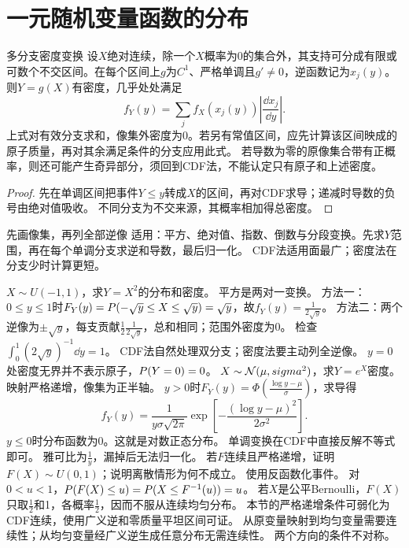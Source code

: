 \section{一元随机变量函数的分布}\label{sec:24}
\begin{theorem}{多分支密度变换}
设$X$绝对连续，除一个$X$概率为0的集合外，其支持可分成有限或可数个不交区间。在每个区间上$g$为$C^1$、严格单调且$g'\ne0$，逆函数记为$x_j(y)$。则$Y=g(X)$有密度，几乎处处满足
\begin{equation}f_Y(y)=\sum_j f_X(x_j(y))\left|\dfrac{\dd x_j}{\dd y}\right|.\end{equation}
上式对有效分支求和，像集外密度为0。若另有常值区间，应先计算该区间映成的原子质量，再对其余满足条件的分支应用此式。
若导数为零的原像集合带有正概率，则还可能产生奇异部分，须回到CDF法，不能认定只有原子和上述密度。
\end{theorem}
\begin{proof}
先在单调区间把事件$Y\le y$转成$X$的区间，再对CDF求导；递减时导数的负号由绝对值吸收。
不同分支为不交来源，其概率相加得总密度。
\end{proof}
\begin{method}{先画像集，再列全部逆像}
适用：平方、绝对值、指数、倒数与分段变换。先求$Y$范围，再在每个单调分支求逆和导数，最后归一化。
CDF法适用面最广；密度法在分支少时计算更短。
\end{method}
{$X\sim U(-1,1)$，求$Y=X^2$的分布和密度。}
{平方是两对一变换。}
{方法一：$0\le y\le1$时$F_Y(y)=P(-\sqrt y\le X\le\sqrt y)=\sqrt y$，故$f_Y(y)=\frac{1}{2\sqrt y}$。
方法二：两个逆像为$\pm\sqrt y$，每支贡献$\frac12\frac1{2\sqrt y}$，总和相同；范围外密度为0。
检查$\int_0^1(2\sqrt y)^{-1}\dd y=1$。}
{CDF法自然处理双分支；密度法要主动列全逆像。}
{$y=0$处密度无界并不表示原子，$P(Y=0)=0$。}
{$X\sim\mathcal N(\mu,sigma^2)$，求$Y=e^X$密度。}
{映射严格递增，像集为正半轴。}
{$y>0$时$F_Y(y)=\Phi(\frac{\log y-\mu}{\sigma})$，求导得
\[f_Y(y)=\dfrac1{y\sigma\sqrt{2\pi}}\exp\!\left[-\dfrac{(\log y-\mu)^2}{2\sigma^2}\right].\]
$y\le0$时分布函数为0。这就是对数正态分布。}
{单调变换在CDF中直接反解不等式即可。}
{雅可比为$\frac{1}{y}$，漏掉后无法归一化。}
{若$F$连续且严格递增，证明$F(X)\sim U(0,1)$；说明离散情形为何不成立。}
{使用反函数化事件。}
{对$0<u<1$，$P(F(X)\le u)=P(X\le F^{-1}(u))=u$。
若$X$是公平Bernoulli，$F(X)$只取$\frac{1}{2}$和1，各概率$\frac{1}{2}$，因而不服从连续均匀分布。
本节的严格递增条件可弱化为CDF连续，使用广义逆和零质量平坦区间可证。}
{从原变量映射到均匀变量需要连续性；从均匀变量经广义逆生成任意分布无需连续性。}
{两个方向的条件不对称。}

